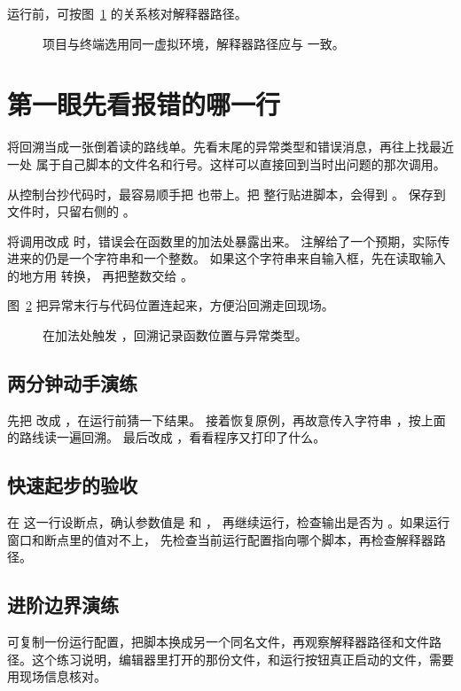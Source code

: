 运行前，可按图~\ref{fig:pycharm-interpreter} 的关系核对解释器路径。
\begin{figure}[htbp]
  \centering
  \caption{项目与终端选用同一虚拟环境，解释器路径应与  一致。}
  \label{fig:pycharm-interpreter}
\end{figure}


\section{第一眼先看报错的哪一行}

将回溯当成一张倒着读的路线单。先看末尾的异常类型和错误消息，再往上找最近一处
属于自己脚本的文件名和行号。这样可以直接回到当时出问题的那次调用。

\begin{pitfall}
从控制台抄代码时，最容易顺手把 \code{>>>} 也带上。把
 整行贴进脚本，会得到 。
保存到  文件时，只留右侧的 。
\end{pitfall}

\begin{pybug}
将调用改成  时，错误会在函数里的加法处暴露出来。
注解给了一个预期，实际传进来的仍是一个字符串和一个整数。
如果这个字符串来自输入框，先在读取输入的地方用  转换，
再把整数交给 。
\end{pybug}

图~\ref{fig:pycharm-traceback} 把异常末行与代码位置连起来，方便沿回溯走回现场。
\begin{figure}[htbp]
  \centering
  \caption{ 在加法处触发 ，回溯记录函数位置与异常类型。}
  \label{fig:pycharm-traceback}
\end{figure}

\subsection*{两分钟动手演练}

先把  改成 ，在运行前猜一下结果。
接着恢复原例，再故意传入字符串 ，按上面的路线读一遍回溯。
最后改成 ，看看程序又打印了什么。

\subsection*{快速起步的验收}

在  这一行设断点，确认参数值是  和 ，
再继续运行，检查输出是否为 。如果运行窗口和断点里的值对不上，
先检查当前运行配置指向哪个脚本，再检查解释器路径。

\subsection*{进阶边界演练}
可复制一份运行配置，把脚本换成另一个同名文件，再观察解释器路径和文件路径。这个练习说明，编辑器里打开的那份文件，和运行按钮真正启动的文件，需要用现场信息核对。
